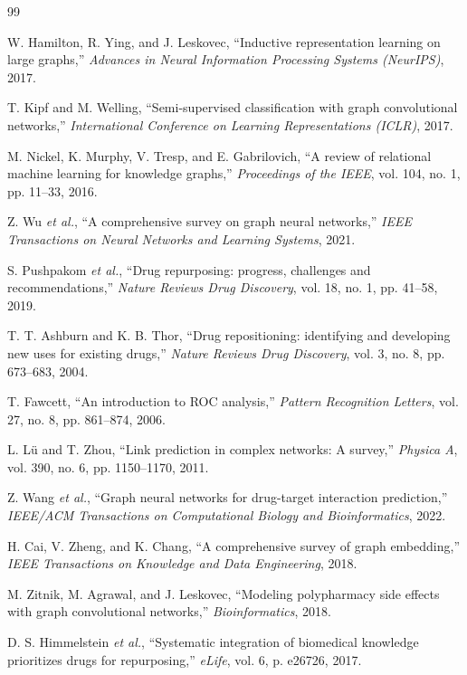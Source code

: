 \documentclass[preprint,12pt]{elsarticle}
\begin{document}
\begin{thebibliography}{99}


 W. Hamilton, R. Ying, and J. Leskovec, 
``Inductive representation learning on large graphs,'' 
\textit{Advances in Neural Information Processing Systems (NeurIPS)}, 2017.

 T. Kipf and M. Welling, 
``Semi-supervised classification with graph convolutional networks,''
\textit{International Conference on Learning Representations (ICLR)}, 2017.

 M. Nickel, K. Murphy, V. Tresp, and E. Gabrilovich, 
``A review of relational machine learning for knowledge graphs,'' 
\textit{Proceedings of the IEEE}, vol. 104, no. 1, pp. 11--33, 2016.

 Z. Wu \textit{et al.}, 
``A comprehensive survey on graph neural networks,'' 
\textit{IEEE Transactions on Neural Networks and Learning Systems}, 2021.

 S. Pushpakom \textit{et al.}, 
``Drug repurposing: progress, challenges and recommendations,'' 
\textit{Nature Reviews Drug Discovery}, vol. 18, no. 1, pp. 41--58, 2019.

 T. T. Ashburn and K. B. Thor, 
``Drug repositioning: identifying and developing new uses for existing drugs,'' 
\textit{Nature Reviews Drug Discovery}, vol. 3, no. 8, pp. 673--683, 2004.

 T. Fawcett, 
``An introduction to ROC analysis,'' 
\textit{Pattern Recognition Letters}, vol. 27, no. 8, pp. 861--874, 2006.

 L. Lü and T. Zhou, 
``Link prediction in complex networks: A survey,'' 
\textit{Physica A}, vol. 390, no. 6, pp. 1150--1170, 2011.

 Z. Wang \textit{et al.}, 
``Graph neural networks for drug-target interaction prediction,'' 
\textit{IEEE/ACM Transactions on Computational Biology and Bioinformatics}, 2022.

 H. Cai, V. Zheng, and K. Chang, 
``A comprehensive survey of graph embedding,'' 
\textit{IEEE Transactions on Knowledge and Data Engineering}, 2018.

 M. Zitnik, M. Agrawal, and J. Leskovec, 
``Modeling polypharmacy side effects with graph convolutional networks,''
\textit{Bioinformatics}, 2018.


 D. S. Himmelstein \textit{et al.}, 
``Systematic integration of biomedical knowledge prioritizes drugs for repurposing,''
\textit{eLife}, vol. 6, p. e26726, 2017.


\end{thebibliography}
\end{document}
